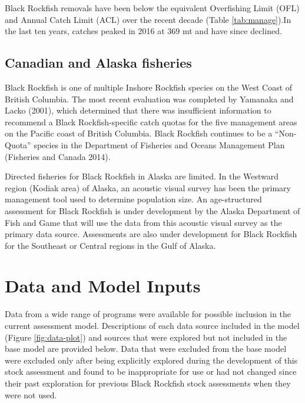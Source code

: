 \documentclass[11pt,
  english,
  letterpaper,
]{article}
\begin{document}
Black Rockfish removals have been below the equivalent Overfishing Limit (OFL) and Annual Catch Limit (ACL) over the recent decade (Table \ref{tab:manage}).In the last ten years, catches peaked in 2016 at 369 mt and have since declined.

\hypertarget{canadian-and-alaska-fisheries}{%
\subsection{Canadian and Alaska fisheries}\label{canadian-and-alaska-fisheries}}

Black Rockfish is one of multiple Inshore Rockfish species on the West Coast of British Columbia. The most recent evaluation was completed by Yamanaka and Lacko (2001), which determined that there was insufficient information to recommend a Black Rockfish-specific catch quotas for the five management areas on the Pacific coast of British Columbia. Black Rockfish continues to be a ``Non-Quota'' species in the Department of Fisheries and Oceans Management Plan (Fisheries and Canada 2014).

Directed fisheries for Black Rockfish in Alaska are limited. In the Westward region (Kodiak area) of Alaska, an acoustic visual survey has been the primary management tool used to determine population size. An age-structured assessment for Black Rockfish is under development by the Alaska Department of Fish and Game that will use the data from this acoustic visual survey as the primary data source. Assessments are also under development for Black Rockfish for the Southeast or Central regions in the Gulf of Alaska.

\hypertarget{data-and-model-inputs}{%
\section{Data and Model Inputs}\label{data-and-model-inputs}}

Data from a wide range of programs were available for possible inclusion in the current assessment model. Descriptions of each data source included in the model (Figure \ref{fig:data-plot}) and sources that were explored but not included in the base model are provided below. Data that were excluded from the base model were excluded only after being explicitly explored during the development of this stock assessment and found to be inappropriate for use or had not changed since their past exploration for previous Black Rockfish stock assessments when they were not used.
\end{document}
